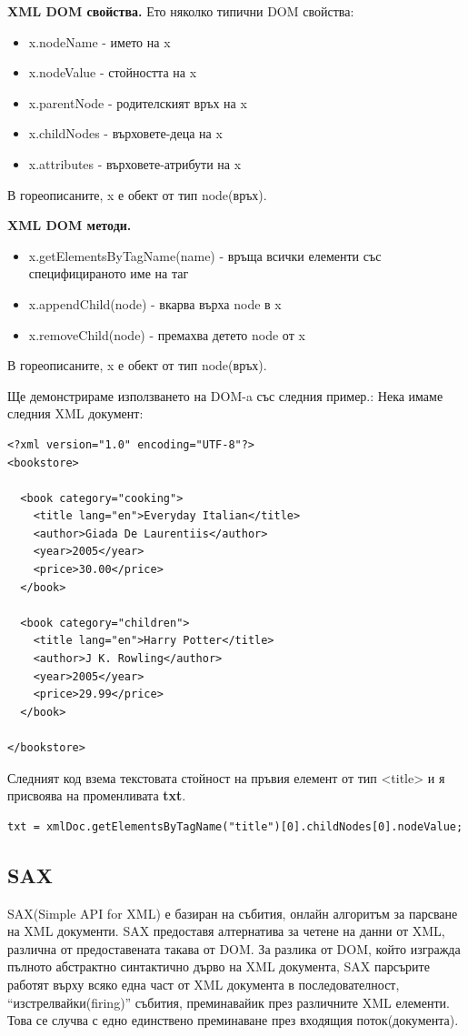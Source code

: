 \documentclass[11pt]{article} %
\begin{document}
\textbf{XML DOM свойства.} Ето няколко типични DOM свойства:
\begin{itemize}[noitemsep]
	\item x.nodeName - името на x
	\item x.nodeValue - стойността на x
	\item x.parentNode - родителският връх на x
	\item x.childNodes - върховете-деца на x
	\item x.attributes - върховете-атрибути на x\\
\end{itemize}
В гореописаните, x е обект от тип node(връх).\\\par

\textbf{XML DOM методи.}
\begin{itemize}[noitemsep]
	\item x.getElementsByTagName(name) - връща всички елементи със специфицираното име на таг
	\item x.appendChild(node) - вкарва върха node в x
	\item x.removeChild(node) - премахва детето node от x\\
\end{itemize}
В гореописаните, x е обект от тип node(връх).\\\par

Ще демонстрираме използването на DOM-a със следния пример.: Нека имаме следния XML документ:
\begin{verbatim}
<?xml version="1.0" encoding="UTF-8"?>
<bookstore>

  <book category="cooking">
    <title lang="en">Everyday Italian</title>
    <author>Giada De Laurentiis</author>
    <year>2005</year>
    <price>30.00</price>
  </book>

  <book category="children">
    <title lang="en">Harry Potter</title>
    <author>J K. Rowling</author>
    <year>2005</year>
    <price>29.99</price>
  </book>

</bookstore>
\end{verbatim}
Следният код взема текстовата стойност на пръвия елемент от тип <title> и я присвоява на променливата \textbf{txt}.
\begin{verbatim}
txt = xmlDoc.getElementsByTagName("title")[0].childNodes[0].nodeValue;
\end{verbatim}

\subsection{SAX}
SAX(Simple API for XML) е базиран на събития, онлайн алгоритъм за парсване на XML документи. SAX предоставя алтернатива за четене на данни от XML, различна от предоставената такава от DOM. За разлика от DOM, който изгражда пълното абстрактно синтактично дърво на XML документа, SAX парсърите работят върху всяко една част от XML документа в последователност, \enquote{изстрелвайки(firing)} събития, преминавайик през различните XML елементи. Това се случва с едно единствено преминаване през входящия поток(документа).\\\par
\end{document}
